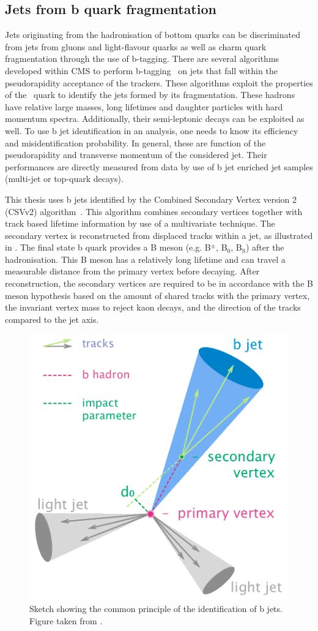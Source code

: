 \subsection{Jets from b quark fragmentation}
\label{sec:BJetID}
Jets originating from the hadronisation of bottom quarks can be discriminated from jets from gluons and light-flavour quarks as well as charm quark fragmentation through the use of b-tagging. There are several algorithms developed within CMS to perform b-tagging~\cite{1748-0221-8-04-P04013,CMS-PAS-BTV-15-001} on jets that fall within the pseudorapidity acceptance of the trackers. These algorithms exploit the properties of the \Pbottom\ quark to identify the jets formed by its fragmentation. These hadrons have relative large masses, long lifetimes and daughter particles with hard momentum spectra. Additionally, their semi-leptonic decays can be exploited as well.  To use b jet identification in an analysis, one needs to know its efficiency and misidentification probability. In general, these are function of the pseudorapidity and transverse momentum of the considered jet. Their performances are directly measured from data by use of b jet enriched jet samples (multi-jet or top-quark decays). 


This thesis uses b jets identified by the Combined Secondary Vertex version 2 (CSVv2) algorithm~\cite{1748-0221-8-04-P04013}. This algorithm combines secondary vertices together with track based lifetime information by use of a multivariate technique. The secondary vertex is reconstructed from displaced tracks within a jet, as illustrated in . The final state b quark provides a B meson (e.g. B$^{\pm}$, B$_0$, B$_{\mathrm{S}}$) after the hadronisation. This B meson has a relatively long lifetime and can travel a measurable distance from the primary vertex before decaying. %
 After reconstruction, the secondary vertices are required to be in accordance with the B meson hypothesis based on the amount of shared tracks with the primary vertex, the invariant vertex mass to reject kaon decays, and the direction of the tracks compared to the jet axis. 
\begin{figure}[htbp]
	\centering
	\includegraphics[width=.5\linewidth]{4_EventRecoSelect/Figures/B-tagging_diagram}
	\caption{Sketch showing the common principle of the identification of b jets. Figure taken from \cite{btagjet}.}
	\label{fig:btaggingdiagram}
\end{figure}

